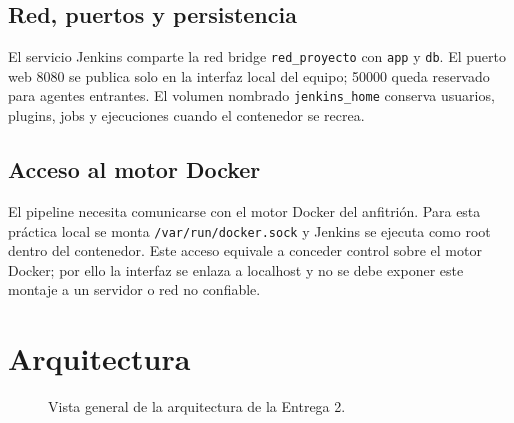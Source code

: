 \documentclass[12pt,a4paper]{article}
\begin{document}
\subsection{Red, puertos y persistencia}
El servicio Jenkins comparte la red bridge \texttt{red\_proyecto} con \texttt{app}
y \texttt{db}. El puerto web 8080 se publica solo en la interfaz local del equipo;
50000 queda reservado para agentes entrantes. El volumen nombrado
\texttt{jenkins\_home} conserva usuarios, plugins, jobs y ejecuciones cuando el
contenedor se recrea.

\subsection{Acceso al motor Docker}
El pipeline necesita comunicarse con el motor Docker del anfitri\'on. Para esta
pr\'actica local se monta \texttt{/var/run/docker.sock} y Jenkins se ejecuta como
root dentro del contenedor. Este acceso equivale a conceder control sobre el
motor Docker; por ello la interfaz se enlaza a localhost y no se debe exponer
este montaje a un servidor o red no confiable.

\section{Arquitectura}
\begin{figure}[H]
\centering
{}
\caption{Vista general de la arquitectura de la Entrega 2.}
\end{figure}
\end{document}
